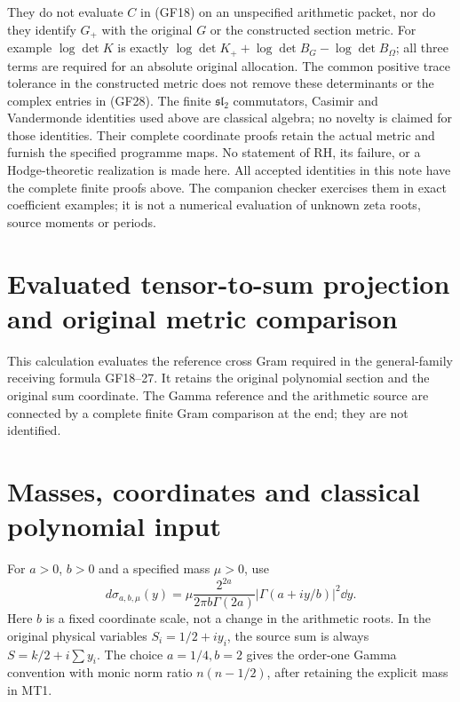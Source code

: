 \documentclass[11pt]{article}
\begin{document}
They do not evaluate $C$ in (GF18) on an unspecified arithmetic packet,
nor do they identify $G_+$ with the original $G$ or the constructed
section metric. For example $\log\det K$ is exactly
$\log\det K_++\log\det B_G-\log\det B_\Omega$; all three terms
are required for an absolute original allocation. The common positive
trace tolerance in the constructed metric does not remove these
determinants or the complex entries in (GF28).
The finite $\mathfrak{sl}_2$ commutators, Casimir and Vandermonde
identities used above are classical algebra; no novelty is claimed
for those identities. Their complete coordinate proofs retain the
actual metric and furnish the specified programme maps.
No statement of RH, its failure, or a Hodge-theoretic realization is
made here. All accepted identities in this note have the complete
finite proofs above. The companion checker exercises them in exact
coefficient examples; it is not a numerical evaluation of unknown
zeta roots, source moments or periods.


\clearpage
\section*{Evaluated tensor-to-sum projection and original metric comparison}

This calculation evaluates the reference cross Gram required in the
general-family receiving formula GF18--27. It retains the original
polynomial section and the original sum coordinate. The Gamma reference
and the arithmetic source are connected by a complete finite Gram
comparison at the end; they are not identified.

\section{Masses, coordinates and classical polynomial input}
For $a>0$, $b>0$ and a specified mass $\mu>0$, use
\begin{equation}\tag{MT1}
 d\sigma_{a,b,\mu}(y)=
 \mu\frac{2^{2a}}{2\pi b\Gamma(2a)}
 |\Gamma(a+iy/b)|^2\dd y.
\end{equation}
Here $b$ is a fixed coordinate scale, not a change in the arithmetic
roots. In the original physical variables $S_i=1/2+iy_i$, the source
sum is always $S=k/2+i\sum y_i$. The choice $a=1/4,b=2$ gives the
order-one Gamma convention with monic norm ratio $n(n-1/2)$, after
retaining the explicit mass in MT1.
\end{document}
